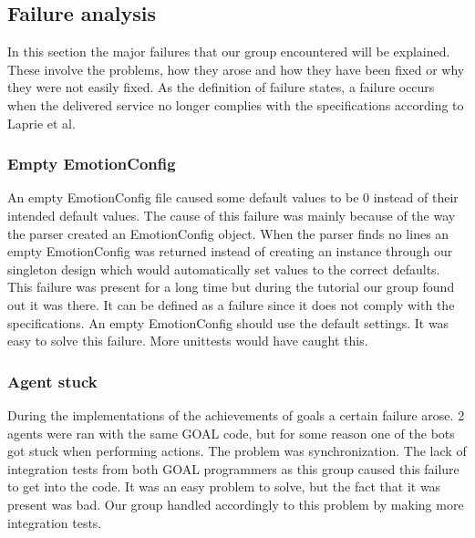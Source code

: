 \documentclass[11pt]{article}
\begin{document}
\subsection{Failure analysis}
In this section the major failures that our group encountered will be explained. These involve the problems, how they arose and how they have been fixed or why they were not easily fixed. As the definition of failure states, a failure occurs when the delivered service no longer complies with the specifications according to Laprie et al.\cite{failure}

\subsubsection*{Empty EmotionConfig}
An empty EmotionConfig file caused some default values to be 0 instead of their intended default values. The cause of this failure was mainly because of the way the parser created an EmotionConfig object. When the parser finds no lines an empty EmotionConfig was returned instead of creating an instance through our singleton design which would automatically set values to the correct defaults. This failure was present for a long time but during the tutorial our group found out it was there. It can be defined as a failure since it does not comply with the specifications. An empty EmotionConfig should use the default settings. It was easy to solve this failure. More unittests would have caught this.

\subsubsection*{Agent stuck}
During the implementations of the achievements of goals a certain failure arose. 2 agents were ran with the same GOAL code, but for some reason one of the bots got stuck when performing actions. The problem was synchronization. The lack of integration tests from both GOAL programmers as this group caused this failure to get into the code. It was an easy problem to solve, but the fact that it was present was bad. Our group handled accordingly to this problem by making more integration tests. 
\end{document}

